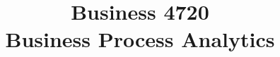 \documentclass{article}
\title{Business 4720\\ \vspace{\baselineskip}
Business Process Analytics}
\begin{document}
\maketitle

\vfill

\clearpage


\end{document}
